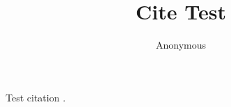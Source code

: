 \documentclass{article}
\begin{document}
\title{Cite Test}
\author{Anonymous}
\maketitle
Test citation \citep{perez2022sycophancy}.


\end{document}

